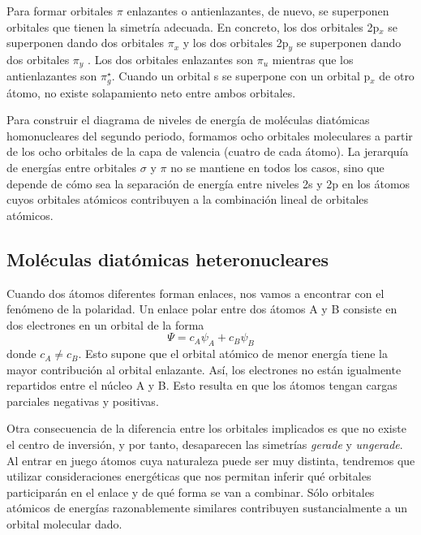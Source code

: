 \documentclass{tufte-handout}
\begin{document}
Para formar orbitales $\pi$ enlazantes o antienlazantes, de nuevo, se superponen orbitales que tienen la simetría adecuada. 
En concreto, los dos orbitales 2p$_x$ se superponen dando dos orbitales $\pi_x$ y los dos orbitales 2p$_y$ se superponen dando dos orbitales $\pi_y$ . 
Los dos orbitales enlazantes son $\pi_u$ mientras que los antienlazantes son $\pi_g^\star$.
Cuando un orbital s se superpone con un orbital p$_x$ de otro átomo, no existe solapamiento neto entre ambos orbitales.

Para construir el diagrama de niveles de energía de moléculas diatómicas homonucleares del segundo periodo, formamos ocho orbitales moleculares a partir de los ocho orbitales de la capa de valencia (cuatro de cada átomo).
La jerarquía de energías entre orbitales $\sigma$ y $\pi$ no se mantiene en todos los casos, sino que depende de cómo sea la separación de energía entre niveles 2s y 2p en los átomos cuyos orbitales atómicos contribuyen a la combinación lineal de orbitales atómicos.

\subsection{Moléculas diatómicas heteronucleares}
Cuando dos átomos diferentes forman enlaces, nos vamos a encontrar con el fenómeno de la polaridad. 
Un enlace polar entre dos átomos A y B consiste en dos  electrones en un orbital de la forma
\begin{equation}
    \Psi=c_A\psi_A + c_B\psi_B\label{eq:polar}
\end{equation}
donde $c_A\neq c_B$. 
Esto supone que el orbital atómico de menor energía tiene la mayor contribución al orbital enlazante. 
Así, los electrones no están igualmente repartidos entre el núcleo A y B. 
Esto resulta en que los átomos tengan cargas parciales negativas y positivas.

Otra consecuencia de la diferencia entre los orbitales  implicados es que no existe el centro de inversión, y  por tanto, desaparecen las simetrías \textit{gerade} y \textit{ungerade}. 
Al entrar en juego átomos cuya naturaleza puede ser muy distinta, tendremos que utilizar consideraciones energéticas que nos permitan inferir qué orbitales participarán en el enlace y de qué forma se van a combinar. 
Sólo orbitales atómicos de energías razonablemente similares contribuyen sustancialmente a un orbital molecular dado.
\end{document}
